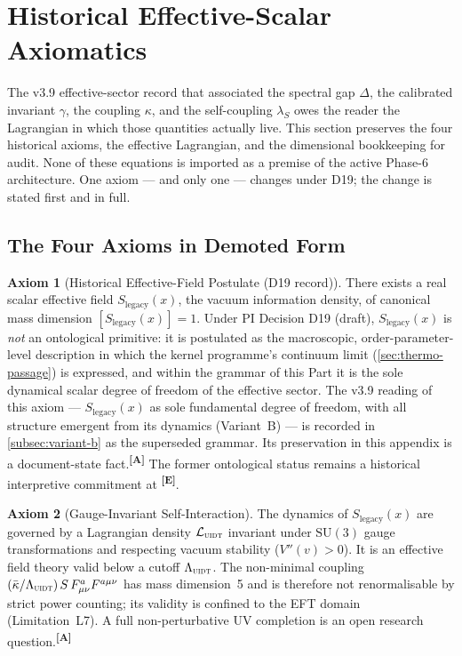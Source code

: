 \documentclass[12pt,a4paper,twoside]{article}
\theoremstyle{plain}
\theoremstyle{definition}
\newtheorem{axiom}{Axiom}
\theoremstyle{remark}
\newcommand{\UIDT}{\textsc{uidt}}
\newcommand{\catmark}[1]{\textsuperscript{\textsf{\textbf{[#1]}}}}
\newcommand{\LegacySx}{S_{\mathrm{legacy}}(x)} %
\begin{document}
\section{Historical Effective-Scalar Axiomatics}
\label{sec:axiomatics}
\label{app:scalar-museum}

\noindent The v3.9 effective-sector record that associated the spectral gap $\Delta$, the
calibrated invariant $\gamma$, the coupling $\kappa$, and the
self-coupling $\lambda_S$ owes the reader the Lagrangian in which those
quantities actually live. This section preserves the four historical axioms, the effective
Lagrangian, and the dimensional bookkeeping for audit. None of these equations
is imported as a premise of the active Phase-6 architecture.
One axiom --- and only one --- changes under D19; the change is stated
first and in full.

\subsection{The Four Axioms in Demoted Form}
\label{subsec:four-axioms}

\begin{axiom}[Historical Effective-Field Postulate (D19 record)]
\label{ax:primacy}
There exists a real scalar effective field $\LegacySx$, the vacuum information
density, of canonical mass dimension $[\LegacySx]=1$. Under PI Decision D19
(draft), $\LegacySx$ is \emph{not} an ontological primitive: it is postulated
as the macroscopic, order-parameter-level description in which the
kernel programme's continuum limit (\cref{sec:thermo-passage}) is
expressed, and within the grammar of this Part it is the sole dynamical
scalar degree of freedom of the effective sector. The v3.9 reading of
this axiom --- $\LegacySx$ as sole fundamental degree of freedom, with all
structure emergent from its dynamics (Variant~B) --- is recorded in
\cref{subsec:variant-b} as the superseded grammar. Its preservation in this
appendix is a document-state fact.\catmark{A} The former ontological status
remains a historical interpretive commitment at \catmark{E}.
\end{axiom}

\begin{axiom}[Gauge-Invariant Self-Interaction]
\label{ax:gauge}
The dynamics of $\LegacySx$ are governed by a Lagrangian density
$\mathcal{L}_{\UIDT}$ invariant under $\mathrm{SU}(3)$ gauge
transformations and respecting vacuum stability ($V''(v)>0$). It is an
effective field theory valid below a cutoff $\Lambda_{\UIDT}$. The
non-minimal coupling
$(\bar\kappa/\Lambda_{\UIDT})\,S\,F_{\mu\nu}^a F^{a\mu\nu}$ has mass
dimension~5 and is therefore not renormalisable by strict power
counting; its validity is confined to the EFT domain (Limitation~L7). A
full non-perturbative UV completion is an open research
question.\catmark{A}
\end{axiom}
\end{document}

